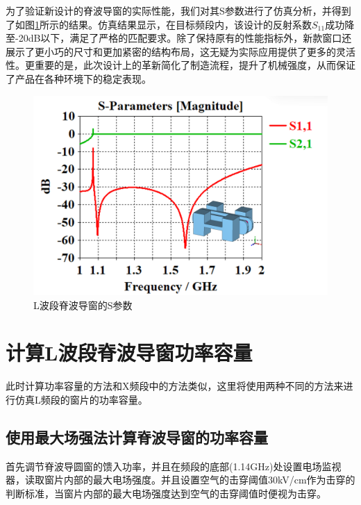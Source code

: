 \documentclass[master]{thesis-uestc}
\begin{document}
为了验证新设计的脊波导窗的实际性能，我们对其S参数进行了仿真分析，并得到了如图\ref{fig:L波段脊波导窗的S参数}所示的结果。仿真结果显示，在目标频段内，该设计的反射系数$S_{11}$成功降至-20dB以下，满足了严格的匹配要求。除了保持原有的性能指标外，新款窗口还展示了更小巧的尺寸和更加紧密的结构布局，这无疑为实际应用提供了更多的灵活性。更重要的是，此次设计上的革新简化了制造流程，提升了机械强度，从而保证了产品在各种环境下的稳定表现。

\begin{figure}[!htb]
    \centering
    \includegraphics[width=0.45\linewidth]{pic/chapter4/L波段脊波导窗S参数.png}
    \caption{L波段脊波导窗的S参数}
    \label{fig:L波段脊波导窗的S参数}
\end{figure}
\section{计算L波段脊波导窗功率容量}
此时计算功率容量的方法和X频段中的方法类似，这里将使用两种不同的方法来进行仿真L频段的窗片的功率容量。
\subsection{使用最大场强法计算脊波导窗的功率容量}
首先调节脊波导圆窗的馈入功率，并且在频段的底部(1.14GHz)处设置电场监视器，读取窗片内部的最大电场强度。并且设置空气的击穿阈值30kV/cm作为击穿的判断标准，当窗片内部的最大电场强度达到空气的击穿阈值时便视为击穿。
\end{document}

